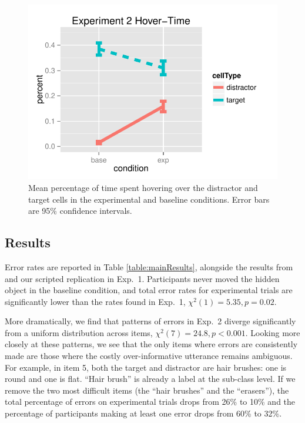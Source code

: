 \documentclass[10pt,letterpaper]{article}
\begin{document}
\begin{figure}[b!]
\begin{center}
\includegraphics[scale=.75]{images/exp2MouseTracking.pdf}
\caption{Mean percentage of time spent hovering over the distractor and target cells in the experimental and baseline conditions. Error bars are 95\% confidence intervals. }
\label{fig:exp2hover}
\end{center}
\end{figure}

\subsection{Results}

Error rates are reported in Table \ref{table:mainResults}, alongside the results from  and our scripted replication in Exp.~1. Participants never moved the hidden object in the baseline condition, and total error rates for experimental trials are significantly lower than the rates found in Exp.~1, $\chi^2(1) = 5.35, p = 0.02$.

More dramatically, we find that patterns of errors in Exp.~2 diverge significantly from a uniform distribution across items, $\chi^2(7) = 24.8, p < 0.001$. Looking more closely at these patterns, we see that the only items where errors are consistently made are those where the costly over-informative utterance remains ambiguous. For example, in item 5, both the target and distractor are hair brushes: one is round and one is flat. ``Hair brush'' is already a label at the sub-class level. If we remove the two most difficult items (the ``hair brushes'' and the ``erasers''), the total percentage of errors on experimental trials drops from 26\% to 10\% and the percentage of participants making at least one error drops from 60\% to 32\%.
\end{document}
